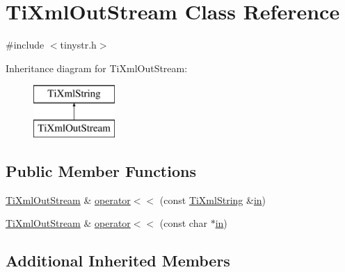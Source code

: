 \hypertarget{class_ti_xml_out_stream}{\section{Ti\-Xml\-Out\-Stream Class Reference}
\label{class_ti_xml_out_stream}
}


{\ttfamily \#include $<$tinystr.\-h$>$}

Inheritance diagram for Ti\-Xml\-Out\-Stream\-:\begin{figure}[H]
\begin{center}
\leavevmode
\includegraphics[height=2.000000cm]{class_ti_xml_out_stream}
\end{center}
\end{figure}
\subsection*{Public Member Functions}
\begin{DoxyCompactItemize}
\item 
\hyperlink{class_ti_xml_out_stream}{Ti\-Xml\-Out\-Stream} \& \hyperlink{class_ti_xml_out_stream_a3640dcb1c0903be3bc6966cdc9a79db6}{operator$<$$<$} (const \hyperlink{class_ti_xml_string}{Ti\-Xml\-String} \&\hyperlink{glew_8h_a83ad0ee7f1e06b59c90271716e689080}{in})
\item 
\hyperlink{class_ti_xml_out_stream}{Ti\-Xml\-Out\-Stream} \& \hyperlink{class_ti_xml_out_stream_af2117e5a8cbfcb69544804ad2859bfb6}{operator$<$$<$} (const char $\ast$\hyperlink{glew_8h_a83ad0ee7f1e06b59c90271716e689080}{in})
\end{DoxyCompactItemize}
\subsection*{Additional Inherited Members}


